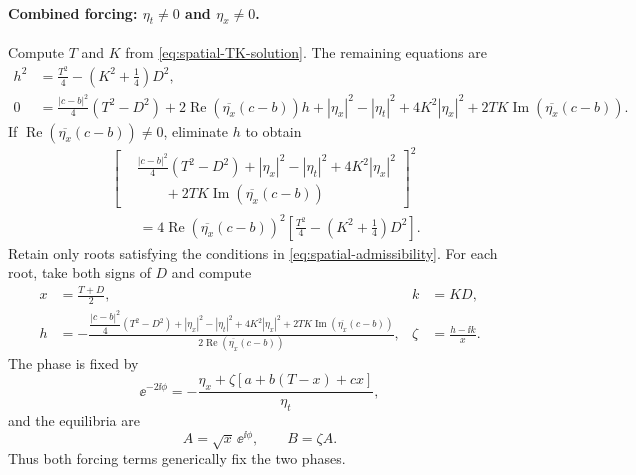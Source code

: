 \paragraph{Combined forcing: $\eta_t\neq0$ and $\eta_x\neq0$.}
Compute $T$ and $K$ from \eqref{eq:spatial-TK-solution}.  The remaining
equations are
\begin{align}
 h^2
 &=\frac{T^2}{4}-\left(K^2+\frac14\right)D^2,
 \label{eq:combined-h-constraint}\\
 0
 &=\frac{|c-b|^2}{4}(T^2-D^2)
   +2\operatorname{Re}\!\left(\overline{\eta_x}(c-b)\right)h
   +|\eta_x|^2-|\eta_t|^2+4K^2|\eta_x|^2
   +2TK\operatorname{Im}\!\left(\overline{\eta_x}(c-b)\right).
 \label{eq:combined-h-balance}
\end{align}
If $\operatorname{Re}(\overline{\eta_x}(c-b))\neq0$, eliminate $h$ to
obtain
\begin{equation}
 \begin{aligned}
 &\left[
  \begin{aligned}
   &\frac{|c-b|^2}{4}(T^2-D^2)
    +|\eta_x|^2-|\eta_t|^2+4K^2|\eta_x|^2\\
   &\qquad
    +2TK\operatorname{Im}\!\left(\overline{\eta_x}(c-b)\right)
  \end{aligned}
 \right]^2\\
 &\qquad
 =4\operatorname{Re}\!\left(\overline{\eta_x}(c-b)\right)^2
 \left[
  \frac{T^2}{4}-\left(K^2+\frac14\right)D^2
 \right].
 \end{aligned}
 \label{eq:combined-D-quadratic}
\end{equation}
Retain only roots satisfying the conditions in
\eqref{eq:spatial-admissibility}.  For each root, take both signs of $D$ and
compute
\begin{equation}
 \begin{aligned}
 x&=\frac{T+D}{2},
 &k&=KD,\\
 h&=-\frac{
 \dfrac{|c-b|^2}{4}(T^2-D^2)
 +|\eta_x|^2-|\eta_t|^2+4K^2|\eta_x|^2
 +2TK\operatorname{Im}\!\left(\overline{\eta_x}(c-b)\right)}
 {2\operatorname{Re}\!\left(\overline{\eta_x}(c-b)\right)},
 &\zeta&=\frac{h-\ii k}{x}.
 \end{aligned}
 \label{eq:combined-reconstruction}
\end{equation}
The phase is fixed by
\begin{equation}
 \ee^{-2\ii\phi}
 =-\frac{\eta_x+\zeta\left[a+b(T-x)+cx\right]}{\eta_t},
 \label{eq:combined-phase}
\end{equation}
and the equilibria are
\begin{equation}
 A=\sqrt{x}\,\ee^{\ii\phi},
 \qquad
 B=\zeta A.
 \label{eq:combined-equilibria}
\end{equation}
Thus both forcing terms generically fix the two phases.

